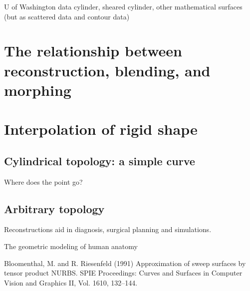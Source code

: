 U of Washington data
cylinder, sheared cylinder, other mathematical surfaces (but as
		scattered data and contour data)











\section{The relationship between reconstruction, blending, and morphing}

\section{Interpolation of rigid shape}
\subsection{Cylindrical topology: a simple curve}
	Where does the point go?
\subsection{Arbitrary topology}





Reconstructions aid in diagnosis, surgical planning and simulations.

The geometric modeling of human anatomy


\begin{thebibliography}{Shoemake 85}

Bloomenthal, M. and R. Riesenfeld (1991)
Approximation of sweep surfaces by tensor product NURBS.
SPIE Proceedings: Curves and Surfaces in Computer Vision and Graphics II,
Vol. 1610, 132--144.
\end{thebibliography}



